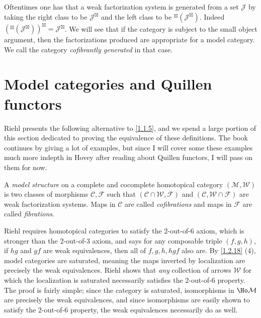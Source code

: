 \begin{remark}\label{2.2.4}
	Oftentimes one has that a weak factorization system is generated from a set $\mathcal{J} $ by taking the right class to be $\mathcal{J}^{\boxtimes} $ and the left class to be ${}^{\boxtimes} (\mathcal{J} ^{\boxtimes} )$. Indeed $(^\boxtimes(\mathcal{J} ^\boxtimes))^\boxtimes=\mathcal{J} ^\boxtimes$. We will see that if the category is subject to the small object argument, then the factorizations produced are appropriate for a model category. We call the category \emph{cofibrantly generated} in that case.
\end{remark}

\section{Model categories and Quillen functors}

Riehl presents the following alternative to \cref{1.1.5}, and we spend a large portion of this section dedicated to proving the equivalence of these definitions. The book continues by giving a lot of examples, but since I will cover some these examples much more indepth in Hovey after reading about Quillen functors, I will pass on them for now.

\begin{definition}\label{2.3.1}
	A \emph{model structure} on a complete and cocomplete homotopical category $(\mathcal{M} ,\mathcal{W} )$ is two classes of morphisms $\mathcal{C} ,\mathcal{F} $ such that $(\mathcal{C} \cap \mathcal{W} ,\mathcal{F} )$ and $(\mathcal{C} ,\mathcal{W} \cap \mathcal{F} )$ are weak factorization systems. Maps in $\mathcal{C} $ are called \emph{cofibrations} and maps in $\mathcal{F} $ are called \emph{fibrations}.
\end{definition}

\begin{remark}\label{2.3.2}
	Riehl requires homotopical categories to satisfy the 2-out-of-6 axiom, which is stronger than the 2-out-of-3 axiom, and says for any composable triple $(f,g,h)$, if $hg$ and $gf$ are weak equivalences, then all of $f,g,h,hgf$ also are. By \cref{1.2.18} (4), model categories are saturated, meaning the maps inverted by localization are precisely the weak equivalences. Riehl shows that \emph{any} collection of arrows $\mathcal{W} $ for which the localization is saturated necessarily satisfies the 2-out-of-6 property. The proof is fairly simple; since the category is saturated, isomorphisms in $\Ho \mathcal{M} $ are precisely the weak equivalences, and since isomorphisms are easily shown to satisfy the 2-out-of-6 property, the weak equivalences necessarily do as well.
\end{remark}

